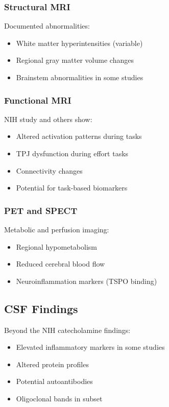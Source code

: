 \subsubsection{Structural MRI}
Documented abnormalities:
\begin{itemize}
    \item White matter hyperintensities (variable)
    \item Regional gray matter volume changes
    \item Brainstem abnormalities in some studies
\end{itemize}

\subsubsection{Functional MRI}
NIH study and others show:
\begin{itemize}
    \item Altered activation patterns during tasks
    \item TPJ dysfunction during effort tasks
    \item Connectivity changes
    \item Potential for task-based biomarkers
\end{itemize}

\subsubsection{PET and SPECT}
Metabolic and perfusion imaging:
\begin{itemize}
    \item Regional hypometabolism
    \item Reduced cerebral blood flow
    \item Neuroinflammation markers (TSPO binding)
\end{itemize}

\subsection{CSF Findings}

Beyond the NIH catecholamine findings:
\begin{itemize}
    \item Elevated inflammatory markers in some studies
    \item Altered protein profiles
    \item Potential autoantibodies
    \item Oligoclonal bands in subset
\end{itemize}

